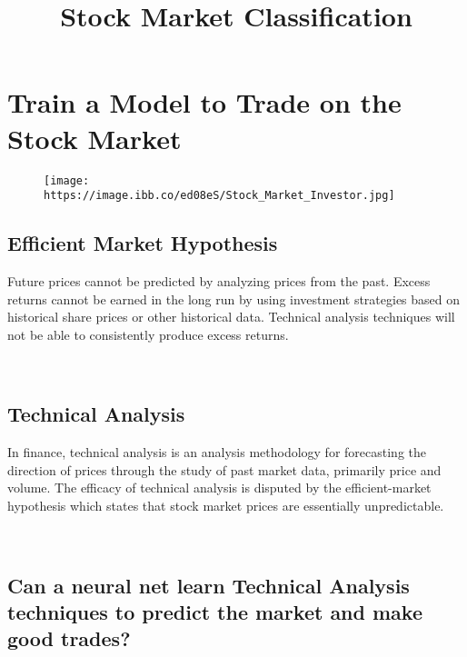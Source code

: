 \documentclass[11pt]{article}
\title{Stock Market Classification}
\makeatletter
\def\maxwidth{\ifdim\Gin@nat@width>\linewidth\linewidth
    \else\Gin@nat@width\fi}
\let\Oldincludegraphics\includegraphics
\renewcommand{\includegraphics}[1]{\Oldincludegraphics[width=.8\maxwidth]{#1}}
\makeatother
\begin{document}
    
    
    \maketitle
    
    

    
    \section{Train a Model to Trade on the Stock
Market}\label{train-a-model-to-trade-on-the-stock-market}

\begin{figure}[htbp]
\centering
\texttt{[image: https://image.ibb.co/ed08eS/Stock\_Market\_Investor.jpg]}
\caption{}
\end{figure}

\subsection{Efficient Market
Hypothesis}\label{efficient-market-hypothesis}

Future prices cannot be predicted by analyzing prices from the past.
Excess returns cannot be earned in the long run by using investment
strategies based on historical share prices or other historical data.
Technical analysis techniques will not be able to consistently produce
excess returns.

~

\subsection{Technical Analysis}\label{technical-analysis}

In finance, technical analysis is an analysis methodology for
forecasting the direction of prices through the study of past market
data, primarily price and volume. The efficacy of technical analysis is
disputed by the efficient-market hypothesis which states that stock
market prices are essentially unpredictable.

~

\subsection{Can a neural net learn Technical Analysis techniques to
predict the market and make good
trades?}\label{can-a-neural-net-learn-technical-analysis-techniques-to-predict-the-market-and-make-good-trades}
\end{document}
